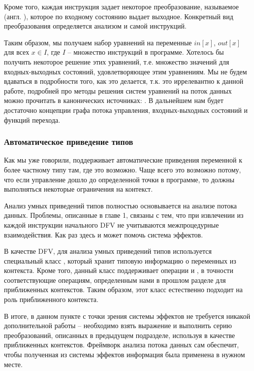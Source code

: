 Кроме того, каждая инструкция задает некоторое преобразование, называемое  (англ. ), которое по входному состоянию выдает выходное. Конкретный вид преобразования определяется анализом и самой инструкций.

Таким образом, мы получаем набор уравнений на переменные $in[x]$, $out[x]$ для всех $x \in I$, где $I$ -- множество инструкций в программе. Хотелось бы получить некоторое решение этих уравнений, т.е. множество значений для входных-выходных состояний, удовлетворяющее этим уравнениям. Мы не будем вдаваться в подробности того, как это делается, т.к. это иррелевантно к данной работе, подробней про методы решения систем уравнений на поток данных можно прочитать в канонических источниках: \cite{dragon-book, muchnick}. В дальнейшем нам будет достаточно концепции графа потока управления, входных-выходных состояний и функций перехода.

\subsubsection{Автоматическое приведение типов}

\label{section-upgrading-smartcasts}

Как мы уже говорили,  поддерживает автоматические приведения переменной к более частному типу там, где это возможно. Чаще всего это возможно потому, что если управление дошло до определенной точки в программе, то должны выполняться некоторые ограничения на контекст.

Анализ умных приведений типов полностью основывается на анализе потока данных. Проблемы, описанные в главе 1, связаны с тем, что при извлечении из каждой инструкции начального DFV не учитываются межпроцедурные взаимодействия. Как раз здесь и может помочь система эффектов.

В качестве DFV, для анализа умных приведений типов используется специальный класс , который хранит типовую информацию о переменных из контекста. Кроме того, данный класс поддерживает операции  и , в точности соответствующие операциям, определенным нами в прошлом разделе для приближенных контекстов. Таким образом, этот класс естественно подходит на роль приближенного контекста.

В итоге, в данном пункте с точки зрения системы эффектов не требуется никакой дополнительной работы -- необходимо взять выражение и выполнить серию преобразований, описанных в предыдущем подразделе, используя  в качестве приближенных контекстов. Фреймворк анализа потока данных сам обеспечит, чтобы полученная из системы эффектов информация была применена в нужном месте.


